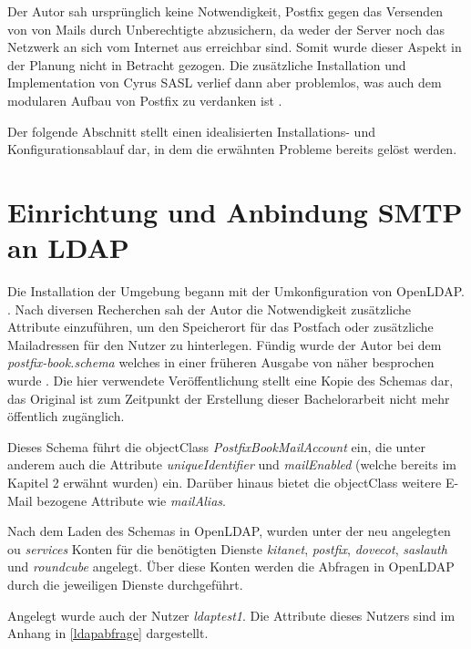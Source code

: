 Der Autor sah ursprünglich keine Notwendigkeit, Postfix gegen das Versenden von von Mails durch Unberechtigte abzusichern, da weder der Server noch das Netzwerk an sich vom Internet aus erreichbar sind. 
Somit wurde dieser Aspekt in der Planung nicht in Betracht gezogen. 
Die zusätzliche Installation und Implementation von Cyrus SASL verlief dann aber problemlos, was auch dem modularen Aufbau von Postfix zu verdanken ist \citep[zu Postfix und Cyrus SASL vgl.][S. 210 ff.]{Heinlein2004}.

Der folgende Abschnitt stellt einen idealisierten Installations- und Konfigurationsablauf dar, in dem die erwähnten Probleme bereits gelöst werden.

\section{Einrichtung und Anbindung SMTP an LDAP}

Die Installation der Umgebung begann mit der Umkonfiguration von OpenLDAP.  \citep[][615]{Deimeke2019}. 
Nach diversen Recherchen sah der Autor die Notwendigkeit zusätzliche Attribute einzuführen, um den Speicherort für das Postfach oder zusätzliche Mailadressen für den Nutzer zu hinterlegen. 
Fündig wurde der Autor bei dem \textit{postfix-book.schema} welches in einer früheren Ausgabe von \cite{Heinlein2004} näher besprochen wurde \citep[vgl.][]{pfschema}. Die hier verwendete Veröffentlichung stellt eine Kopie des Schemas dar, das Original ist zum Zeitpunkt der Erstellung dieser Bachelorarbeit nicht mehr öffentlich zugänglich.

Dieses Schema führt die objectClass \textit{PostfixBookMailAccount} ein, die unter anderem auch die Attribute \textit{uniqueIdentifier} und \textit{mailEnabled} (welche bereits im Kapitel 2 erwähnt wurden) ein. Darüber hinaus bietet die objectClass weitere E-Mail bezogene Attribute wie \zb \textit{mailAlias}.  

Nach dem Laden des Schemas in OpenLDAP, wurden unter der neu angelegten \ac{ou} \textit{services} Konten für die benötigten Dienste \textit{kitanet}, \textit{postfix}, \textit{dovecot}, \textit{saslauth} und \textit{roundcube} angelegt. 
Über diese Konten werden die Abfragen in OpenLDAP durch die jeweiligen Dienste durchgeführt. 

Angelegt wurde auch der Nutzer \textit{ldaptest1}. Die Attribute dieses Nutzers sind im Anhang in \autoref{ldapabfrage} dargestellt.

